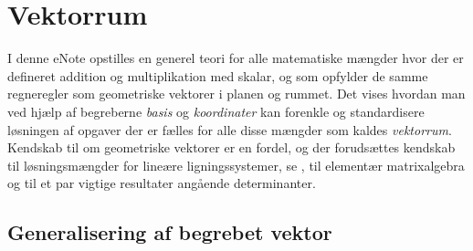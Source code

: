 
\setcounter{chapter}{6} %

\chapter{Vektorrum} \label{tn7}

\begin{basis}
I denne eNote opstilles en generel teori for alle matematiske mængder hvor der er defineret addition og multiplikation med skalar, og som opfylder de samme regneregler som geometriske vektorer i planen og rummet. Det vises hvordan man ved hjælp af begreberne \textit{basis} og \textit{koordinater} kan forenkle og standardisere løsningen af opgaver der er fælles for alle disse mængder som kaldes \textit{vektorrum}. Kendskab til  om geometriske vektorer er en fordel, og der forudsættes kendskab til løsningsmængder for lineære ligningssystemer, se , til elementær matrixalgebra og til et par vigtige resultater angående determinanter.
\end{basis}

\section{Generalisering af begrebet vektor}

